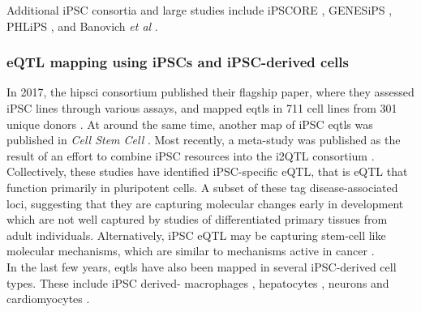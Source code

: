 


Additional iPSC consortia and large studies include
iPSCORE \cite{panopoulos2017ipscore}, GENESiPS \cite{carcamo2017analysis}, PHLiPS \cite{pashos2017large}, and Banovich \textit{et al} \cite{banovich2018impact}.

\subsubsection{eQTL mapping using iPSCs and iPSC-derived cells}

In 2017, the \gls{hipsci} consortium published their flagship paper, where they assessed iPSC lines through various assays, and mapped \glspl{eqtl} in 711 cell lines from 301 unique donors \cite{kilpinen2017common}.
At around the same time, another map of iPSC \glspl{eqtl} was published in \textit{Cell Stem Cell} \cite{deboever2017large}.
Most recently, a meta-study was published as the result of an effort to combine iPSC resources into the i2QTL consortium \cite{bonder2019systematic}.\\

Collectively, these studies have identified iPSC-specific eQTL, that is eQTL that function primarily in pluripotent cells.
A subset of these tag disease-associated loci, suggesting that they are capturing molecular changes early in development which are not well captured by studies of differentiated primary tissues from adult individuals. 
Alternatively, iPSC eQTL may be capturing stem-cell like molecular mechanisms, which are similar to mechanisms active in cancer \cite{kilpinen2017common}. \\


In the last few years, \glspl{eqtl} have also been mapped in several iPSC-derived cell types.
These include iPSC derived-
macrophages \cite{alasoo2018shared},
hepatocytes \cite{pashos2017large},
neurons \cite{schwartzentruber2018molecular}
and
cardiomyocytes \cite{strober2019dynamic, banovich2018impact}.\\

